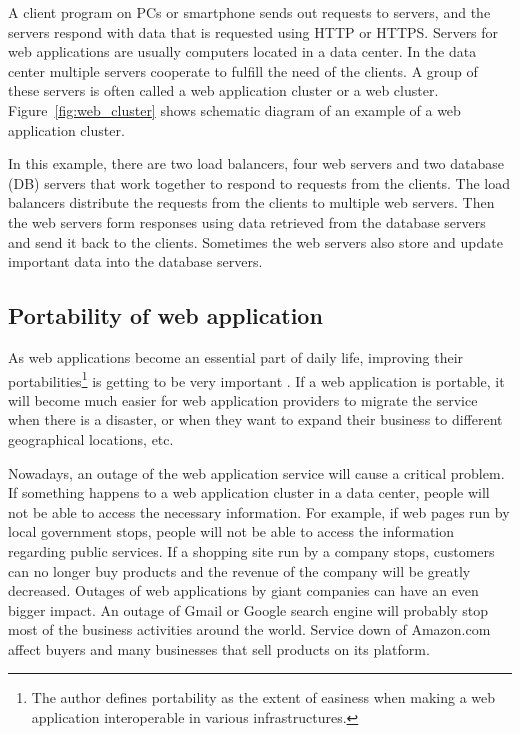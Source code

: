 A client program on PCs or smartphone sends out requests to servers, and the servers respond with data that is requested using HTTP or HTTPS. 
Servers for web applications are usually computers located in a data center.
In the data center multiple servers cooperate to fulfill the need of the clients.
A group of these servers is often called a web application cluster or a web cluster.
Figure~\ref{fig:web_cluster} shows schematic diagram of an example of a web application cluster.

In this example, there are two load balancers, four web servers and two database (DB) servers that work together to respond to  requests from the clients.
The load balancers distribute the requests from the clients to multiple web servers.
Then the web servers form responses using data retrieved from the database servers and send it back to the clients.
Sometimes the web servers also store and update important data into the database servers.

\subsection{Portability of web application}


  As web applications become an essential part of daily life, improving their portabilities\footnote{
    The author defines portability as the extent of easiness when making a web application interoperable in various infrastructures.
  }
 is getting to be very important \cite{opara2016critical,petcu2014portability}.
If a web application is portable, it will become much easier for web application providers to migrate the service when there is a disaster, or when they want to expand their business to different geographical locations, etc. 


 Nowadays, an outage of the web application service will cause a critical problem.
If something happens to a web application cluster in a data center, people will not be able to access the necessary information.
%
For example, if web pages run by local government stops, people will not be able to access the information regarding public services.
If a shopping site run by a company stops, customers can no longer buy products and the revenue of the company will be greatly decreased.
Outages of web applications by giant companies can have an even bigger impact.
An outage of Gmail or Google search engine will probably stop most of the business activities around the world.
Service down of Amazon.com affect buyers and many businesses that sell products on its platform.

